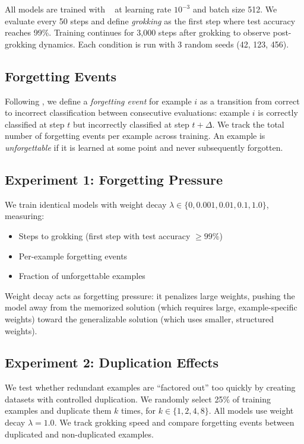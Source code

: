 All models are trained with \adamw~\cite{loshchilov2019decoupled} at learning rate $10^{-3}$ and batch size 512. We evaluate every 50 steps and define \emph{grokking} as the first step where test accuracy reaches 99\%. Training continues for 3,000 steps after grokking to observe post-grokking dynamics. Each condition is run with 3 random seeds (42, 123, 456).

\subsection{Forgetting Events}
\label{sec:forgetting_events}

Following \citet{toneva2019empirical}, we define a \emph{forgetting event} for example $i$ as a transition from correct to incorrect classification between consecutive evaluations: example $i$ is correctly classified at step $t$ but incorrectly classified at step $t + \Delta$. We track the total number of forgetting events per example across training. An example is \emph{unforgettable} if it is learned at some point and never subsequently forgotten.

\subsection{Experiment 1: Forgetting Pressure}
\label{sec:exp1}

We train identical models with weight decay $\lambda \in \{0, 0.001, 0.01, 0.1, 1.0\}$, measuring:
\begin{itemize}[leftmargin=*,itemsep=0pt,topsep=0pt]
    \item Steps to grokking (first step with test accuracy $\geq 99\%$)
    \item Per-example forgetting events
    \item Fraction of unforgettable examples
\end{itemize}
Weight decay acts as forgetting pressure: it penalizes large weights, pushing the model away from the memorized solution (which requires large, example-specific weights) toward the generalizable solution (which uses smaller, structured weights).

\subsection{Experiment 2: Duplication Effects}
\label{sec:exp2}

We test whether redundant examples are ``factored out'' too quickly by creating datasets with controlled duplication. We randomly select 25\% of training examples and duplicate them $k$ times, for $k \in \{1, 2, 4, 8\}$. All models use weight decay $\lambda = 1.0$. We track grokking speed and compare forgetting events between duplicated and non-duplicated examples.

